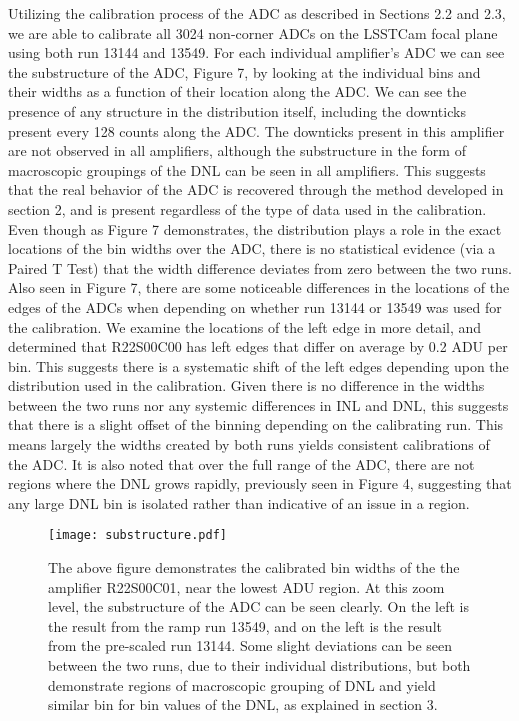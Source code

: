 \documentclass[11pt, letterpaper]{article}
\begin{document}
Utilizing the calibration process of the ADC as described in Sections 2.2 and 2.3, we are able to calibrate all 3024 non-corner ADCs on the LSSTCam focal plane using both run 13144 and 13549. 
For each individual amplifier’s ADC we can see the substructure of the ADC, Figure 7, by looking at the individual bins and their widths as a function of their location along the ADC. 
We can see the presence of any structure in the distribution itself, including the downticks present every 128 counts along the ADC. 
The downticks present in this amplifier are not observed in all amplifiers, although the substructure in the form of macroscopic groupings of the DNL can be seen in all amplifiers.
This suggests that the real behavior of the ADC is recovered through the method developed in section 2, and is present regardless of the type of data used in the calibration.
Even though as Figure 7 demonstrates, the distribution plays a role in the exact locations of the bin widths over the ADC, there is no statistical evidence (via a Paired T Test) that the width difference deviates from zero between the two runs.  
Also seen in Figure 7, there are some noticeable differences in the locations of the edges of the ADCs when depending on whether run 13144 or 13549 was used for the calibration.
We examine the locations of the left edge in more detail, and determined that R22S00C00 has left edges that differ on average by 0.2 ADU per bin. 
This suggests there is a systematic shift of the left edges depending upon the distribution used in the calibration.
Given there is no difference in the widths between the two runs nor any systemic differences in INL and DNL, this suggests that there is a slight offset of the binning depending on the calibrating run.
This means largely the widths created by both runs yields consistent calibrations of the ADC. 
It is also noted that over the full range of the ADC, there are not regions where the DNL grows rapidly, previously seen in Figure 4, suggesting that any large DNL bin is isolated rather than indicative of an issue in a region. 
\begin{figure}
	\texttt{[image: substructure.pdf]}
	\caption{The above figure demonstrates the calibrated bin widths of the the amplifier R22S00C01, near the lowest ADU region. At this zoom level, the substructure of the ADC can be seen clearly. On the left is the result from the ramp run 13549, and on the left is the result from the pre-scaled run 13144.  Some slight deviations can be seen between the two runs, due to their individual distributions, but both demonstrate regions of macroscopic grouping of DNL and yield similar bin for bin values of the DNL, as explained in section 3.}
\end{figure}
\indent 
\end{document}
